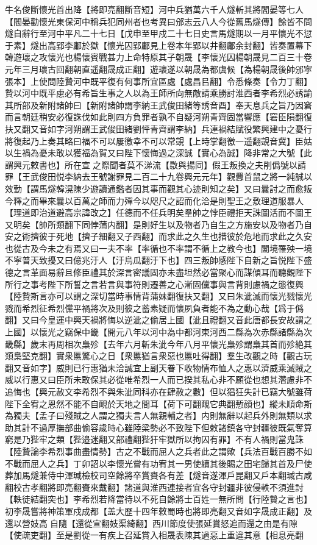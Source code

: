 牛名俊斷懷光首出降【將即亮翻斷音短】河中兵猶萬六千人燧斬其將閻晏等七人【閻晏勸懷光東保河中稱兵犯同州者也考異曰邠志云八人今從舊馬燧傳】餘皆不問燧自辭行至河中平凡二十七日【戊申至甲戍二十七日史言馬燧期以一月平懷光不愆于素】燧出高郢李鄘於獄【懷光囚郢鄘見上卷本年郢以井翻鄘余封翻】皆奏置幕下韓遊瓌之攻懷光也楊懷賓戰甚力上命特原其子朝晟【李懷光囚楊朝晟見二百三十卷元年三月瓌古回翻朝直遥翻晟成正翻】遊瓌遂以朝晟為都虞候【為楊朝晟後帥邠寜張本】上使問陸贄河中既平復有何事所宜區處【處昌㠯翻】令悉條奏【令力丁翻】贄以河中既平慮必有希旨生事之人以為王師所向無敵請乘勝討淮西者李希烈必誘諭其所部及新附諸帥曰【新附諸帥謂李納王武俊田緒等誘音酉】奉天息兵之旨乃因窘而言朝廷稍安必復誅伐如此則四方負罪者孰不自疑河朔青齊固當響應【窘臣隕翻復扶又翻又音如字河朔謂王武俊田緒劉怦青齊謂李納】兵連禍結賦役繁興建中之憂行將復起乃上奏其略曰福不可以屢徼幸不可以常覬【上時掌翻徼一遥翻覬音冀】臣姑以生禍為憂未敢以獲福為賀又曰陛下懷悔過之深誠【實心為誠】降非常之大號【此謂興元敕書也】所在宣之際聞者莫不涕流【敭與揚同】假王叛換之夫削僞號以請罪【王武俊田悦李納去王號謝罪見二百二十九卷興元元年】觀釁首鼠之將一純誠以效勤【謂馬燧韓滉陳少遊讀通鑑者因其事而觀其心迹則知之矣】又曰曩討之而愈叛今釋之而畢來曩以百萬之師而力殫今以咫尺之詔而化洽是則聖王之敷理道服暴人【理道即治道避高宗諱改之】任德而不任兵明矣羣帥之悖臣禮拒天誅圖活而不圖王又明矣【帥所類翻下同悖蒲内翻】是則好生以及物者乃自生之方施安以及物者乃自安之術擠彼于死地【擠子細翻又子西翻】而求此之久生也措彼於危地而求此之久安也從古及今未之有焉又曰一夫不率【率循也不率謂不循上之教今也】闔境罹殃一境不寜普天致擾又曰億兆汙人【汙烏瓜翻汙下也】四三叛帥感陛下自新之旨悦陛下盛德之言革面易辭且修臣禮其於深言密議固亦未盡坦然必當聚心而謀傾耳而聽觀陛下所行之事考陛下所誓之言若言與事符則遷善之心漸固儻事與言背則慮禍之態復興【陸贄斯言亦可以謂之深切當時事情背蒲妹翻復扶又翻】又曰朱泚滅而懷光戮懷光戮而希烈征希烈儻平禍將次及則彼之蓄素疑而懷夙負者能不為之動心哉【爲于僞翻】又曰今皇運中興天禍將悔以逆泚之偷居上國【泚且禮翻又音此唐都長安故謂之上國】以懷光之竊保中畿【開元八年以河中為中都河東河西二縣為次赤縣諸縣為次畿縣】歲末再周相次梟殄【去年六月斬朱泚今年八月平懷光梟殄謂梟其首而殄絶其類梟堅克翻】實衆慝驚心之日【衆慝猶言衆惡也慝吐得翻】羣生改觀之時【觀古玩翻又音如字】威則已行惠猶未洽誠宜上副天眷下收物情布恤人之惠以濟威乘滅賊之威以行惠又曰臣所未敢保其必從唯希烈一人而已揆其私心非不願從也想其濳慮非不追悔也【興元赦文李希烈不與朱泚同科亦在肆赦之數】但以猖狂失計已竊大號雖荷陛下全宥之恩然不能不自靦於天地之間耳【荷下可翻靦它典翻慙顔也】縱未順命斯為獨夫【孟子曰殘賊之人謂之獨夫言人無親輔之者】内則無辭以起兵外則無類以求助其計不過厚撫部曲偷容歲時心雖陸梁勢必不致陛下但敕諸鎮各守封疆彼既氣奪算窮是乃狴牢之類【狴邉迷翻又部禮翻狴犴牢獄所以拘囚有罪】不有人禍則當鬼誅【陸贄論李希烈事曲盡情勢】古之不戰而屈人之兵者此之謂歟【兵法百戰百勝不如不戰而屈人之兵】丁卯詔以李懷光嘗有功宥其一男使續其後賜之田宅歸其首及尸使葬加馬燧兼侍中渾瑊檢校司空餘將卒賞賚各有差【燧音遂渾戶昆翻又戶本翻瑊古咸翻校古孝翻將即亮翻賚來戴翻】諸道與淮西連接者宜各守封疆非彼侵軼不須進討【軼徒結翻突也】李希烈若降當待以不死自餘將士百姓一無所問【行陸䞇之言也】　初李晟嘗將神策軍戍成都【盖大歷十四年敕蜀時也將即亮翻又音如字晟成正翻】及還以營妓高自隨【還從宣翻妓渠綺翻】西川節度使張延賞怒追而還之由是有隙【使疏吏翻】至是劉從一有疾上召延賞入相晟表陳其過惡上重違其意【相息亮翻